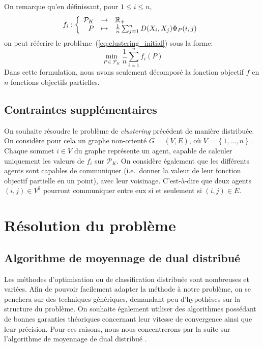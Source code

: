 \documentclass[a4paper]{article}
\begin{document}
On remarque qu'en définissant, pour $1 \leq i \leq n$,
\[
    f_i : \left\{
        \begin{array}{r c l}
            \mathcal{P}_K & \rightarrow & \mathbb{R}_+ \\
            P & \mapsto & \frac{1}{n} \sum_{j = 1}^n D(X_i, X_j) \Phi_P(i, j)
        \end{array}
    \right.
\]
on peut réécrire le problème~(\ref{eq:clustering_initial}) sous la forme:
\begin{equation}
    \label{eq:clustering_distribue}
    \min_{P \in \mathcal{P}_K} \frac{1}{n} \sum_{i = 1}^n f_i(P)
\end{equation}
Dans cette formulation, nous avons seulement décomposé la fonction objectif
$f$ en $n$ fonctions objectifs partielles.

\subsection{Contraintes supplémentaires}
\label{sub:contraintes_supplementaires}

On souhaite résoudre le problème de \emph{clustering} précédent de
manière distribuée.
On considère pour cela un graphe non-orienté $G = (V, E)$, où
$V = \left\{ 1, \ldots, n \right\}$. Chaque sommet $i \in V$ du graphe
représente un agent, capable de calculer uniquement les valeurs de $f_i$
sur $\mathcal{P}_K$. On considère également que les différents agents sont
capables de communiquer (i.e.\ donner la valeur de leur fonction objectif
partielle en un point), avec leur voisinage. C'est-à-dire que deux agents
$(i, j) \in V^2$ pourront communiquer entre eux si et seulement si
$(i, j) \in E$.

\section{Résolution du problème}
\label{sec:resolution_du_probleme}

\subsection{Algorithme de moyennage de dual distribué}
\label{sub:dual_averaging}


Les méthodes d'optimisation ou de classification distribuée sont nombreuses et
variées. Afin de pouvoir facilement adapter la méthode à notre problème, on se
penchera sur des techniques génériques, demandant peu d'hypothèses sur la
structure du problème. On souhaite également utiliser des algorithmes
possédant de bonnes garanties théoriques concernant leur vitesse de convergence
ainsi que leur précision. Pour ces raisons, nous nous concentrerons par la
suite sur l'algorithme de moyennage de dual distribué \cite{duchi2012dual,
nesterov2009primal, xiao2010dual}.
\end{document}
